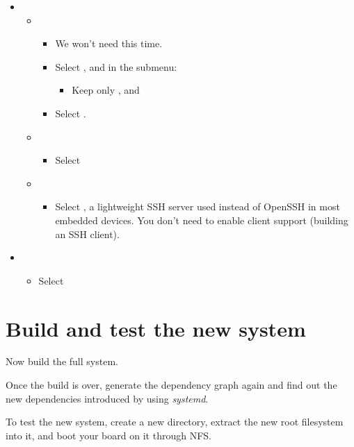 \begin{itemize}
\begin{itemize}
  \end{itemize}
\item {}
  \begin{itemize}
  \item {}
    \begin{itemize}
    \item We won't need  this time.
    \item Select , and in the submenu:
      \begin{itemize}
           \item Keep only ,  and 
      \end{itemize}
    \item Select .
    \end{itemize}
  \item {}
    \begin{itemize}
    \item Select 
    \end{itemize}
  \item {}
    \begin{itemize}
    \item Select , a lightweight SSH server used instead
          of OpenSSH in most embedded devices. You don't need to enable
          client support (building an SSH client).
    \end{itemize}
  \end{itemize}
\item {}
  \begin{itemize}
     \item Select 
  \end{itemize}
\end{itemize}

\section{Build and test the new system}

Now build the full system.

Once the build is over, generate the dependency graph again and find out
the new dependencies introduced by using {\em systemd}.

To test the new system, create a new  directory, extract
the new root filesystem into it, and boot your board on it through NFS.

